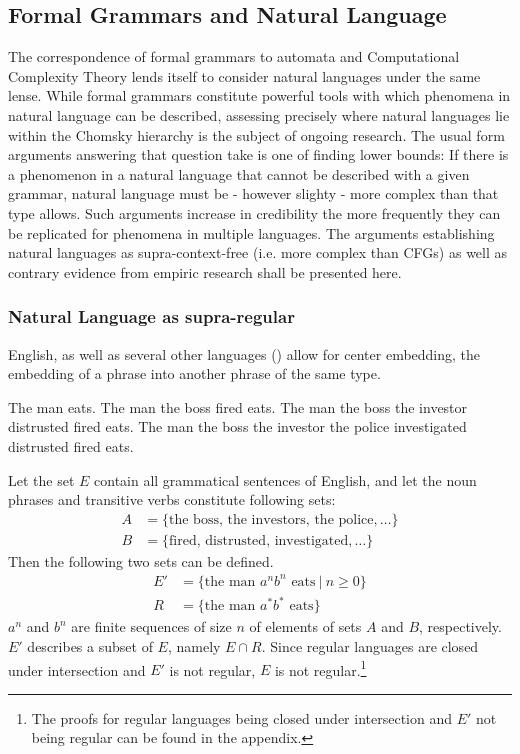 \subsection{Formal Grammars and Natural Language}
The correspondence of formal grammars to automata and Computational Complexity Theory lends itself to consider natural languages under the same lense. While formal grammars constitute powerful tools with which phenomena in natural language can be described, assessing precisely where natural languages lie within the Chomsky hierarchy is the subject of ongoing research.
The usual form arguments answering that question take is one of finding lower bounds: If there is a phenomenon in a natural language that cannot be described with a given grammar, natural language must be - however slighty - more complex than that type allows. Such arguments increase in credibility the more frequently they can be replicated for phenomena in multiple languages. The arguments establishing natural languages as supra-context-free (i.e. more complex than CFGs) as well as contrary evidence from empiric research shall be presented here.

\subsubsection{Natural Language as supra-regular}\label{supraReg}
English, as well as several other languages (\cite{Hagege1976}) allow for center embedding, the embedding of a phrase into another phrase of the same type.
\begin{exe}
	\ex The man eats.
	\ex The man the boss fired eats.
	\ex The man the boss the investor distrusted fired eats.
	\ex The man the boss the investor the police investigated distrusted fired eats.
\end{exe}
Let the set $E$ contain all grammatical sentences of English, and let the noun phrases and transitive verbs constitute following sets:
\begin{align*}
A &= \lbrace \text{the boss}, \, \text{the investors}, \, \text{the police}, \dots \rbrace \\
B &= \lbrace \text{fired}, \, \text{distrusted}, \, \text{investigated}, \dots \rbrace
\end{align*}
Then the following two sets can be defined.
\begin{align*}
E' &= \lbrace \text{the man } a^{n}b^{n} \text{ eats} \: \vert \: n \geq 0 \rbrace \\
R &= \lbrace \text{the man } a^{*}b^{*} \text{ eats} \rbrace
\end{align*}
$a^{n}$ and $b^{n}$ are finite sequences of size $n$ of elements of sets $A$ and $B$, respectively. $E'$ describes a subset of $E$, namely $E \cap R$. Since regular languages are closed under intersection and $E'$ is not regular, $E$ is not regular.\footnote{The proofs for regular languages being closed under intersection and $E'$ not being regular can be found in the appendix.}

